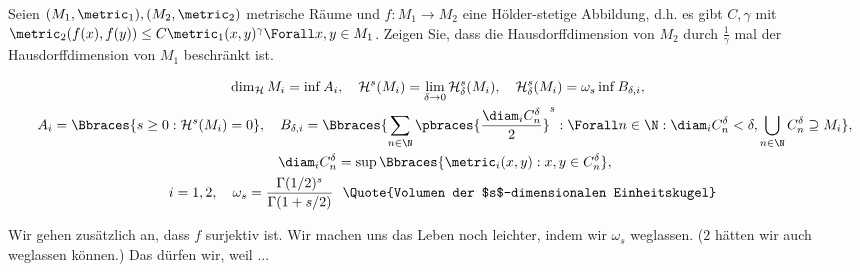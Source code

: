 
\begin{exercise}

Seien $(M_1, \metric_1),(M_2, \metric_2)$ metrische Räume und $f: M_1 \to M_2$ eine Hölder-stetige Abbildung, d.h. es gibt $C, \gamma$ mit $\metric_2(f(x), f(y)) \leq C \metric_1(x, y)^\gamma \Forall x, y \in M_1$.
Zeigen Sie, dass die Hausdorffdimension von $M_2$ durch $\frac{1}{\gamma}$ mal der Hausdorffdimension von $M_1$ beschränkt ist.

\end{exercise}


\begin{solution}

\begin{gather*}
    \dim_\mathcal{H} M_i
    =
    \inf A_i,
    \quad
    \mathcal{H}^s(M_i)
    =
    \lim_{\delta \to 0}
        \mathcal{H}_\delta^s(M_i),
    \quad
    \mathcal{H}_\delta^s(M_i)
    =
    \omega_s
    \inf B_{\delta, i}, \\
    \quad
    A_i
    =
    \Bbraces
    {
        s \geq 0:
        \mathcal{H}^s(M_i) = 0
    },
    \quad
    B_{\delta, i}
    =
    \Bbraces
    {
        \sum_{n \in \N}
            \pbraces
            {
                \frac{\diam_i C_n^\delta}{2}}^s:
                \Forall n \in \N:
                    \diam_i C_n^\delta < \delta,
                \bigcup_{n \in \N} C_n^\delta \supseteq M_i
    }, \\
    \quad
    \diam_i C_n^\delta
    =
    \sup
    \Bbraces
    {
        \metric_i(x, y):
        x, y \in C_n^\delta
    }, \\
    \quad i = 1, 2,
    \quad
    \omega_s
    =
    \frac
    {
        \Gamma(1/2)^s
    }{
        \Gamma(1 + s/2)
    }
    ~\text
    {
        \Quote{Volumen der $s$-dimensionalen Einheitskugel}
    }
\end{gather*}

Wir gehen zusätzlich an, dass $f$ surjektiv ist.
Wir machen uns das Leben noch leichter, indem wir $\omega_s$ weglassen.
($2$ hätten wir auch weglassen können.)
Das dürfen wir, weil ...

\begin{center}
\end{center}


\end{solution}
